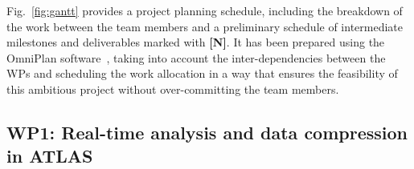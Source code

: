 Fig.~\ref{fig:gantt} provides a project planning schedule, including the breakdown of the work between the team members and a preliminary schedule of intermediate milestones and deliverables marked with \textbf{[N]}. 
It has been prepared using the OmniPlan software~\cite{omni:plan}, %
taking into account the inter-dependencies between the WPs and 
scheduling the work allocation in a way that ensures the feasibility of this ambitious project without over-committing the team members. 

\subsection{WP1: Real-time analysis and data compression in ATLAS}

